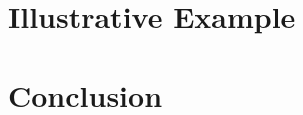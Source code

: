 \documentclass[12pt]{article}
\begin{document}
\section{Illustrative Example}



\section{Conclusion}\label{sec:conclusion}



\appendix
\end{document}

